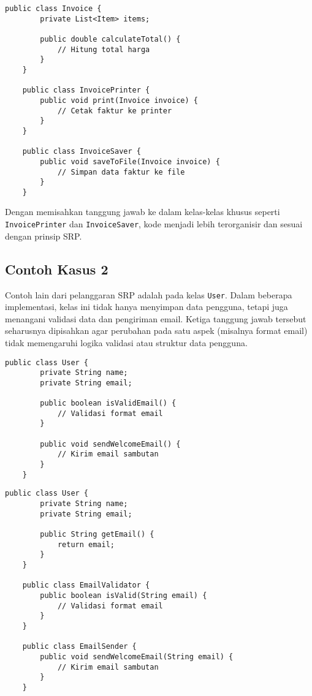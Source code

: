 \begin{lstlisting}[style=JavaStyle, caption={Refaktor menggunakan SRP}]
	public class Invoice {
		private List<Item> items;
		
		public double calculateTotal() {
			// Hitung total harga
		}
	}
	
	public class InvoicePrinter {
		public void print(Invoice invoice) {
			// Cetak faktur ke printer
		}
	}
	
	public class InvoiceSaver {
		public void saveToFile(Invoice invoice) {
			// Simpan data faktur ke file
		}
	}
\end{lstlisting}

Dengan memisahkan tanggung jawab ke dalam kelas-kelas khusus seperti \texttt{InvoicePrinter} dan \texttt{InvoiceSaver}, kode menjadi lebih terorganisir dan sesuai dengan prinsip SRP.

\subsection{Contoh Kasus 2}
Contoh lain dari pelanggaran SRP adalah pada kelas \texttt{User}. Dalam beberapa implementasi, kelas ini tidak hanya menyimpan data pengguna, tetapi juga menangani validasi data dan pengiriman email. Ketiga tanggung jawab tersebut seharusnya dipisahkan agar perubahan pada satu aspek (misalnya format email) tidak memengaruhi logika validasi atau struktur data pengguna.

\begin{lstlisting}[style=JavaStyle, caption={Contoh pelanggaran SRP}]
	public class User {
		private String name;
		private String email;
		
		public boolean isValidEmail() {
			// Validasi format email
		}
		
		public void sendWelcomeEmail() {
			// Kirim email sambutan
		}
	}
\end{lstlisting}

\begin{lstlisting}[style=JavaStyle, caption={Refaktor menggunakan SRP}]
	public class User {
		private String name;
		private String email;
		
		public String getEmail() {
			return email;
		}
	}
	
	public class EmailValidator {
		public boolean isValid(String email) {
			// Validasi format email
		}
	}
	
	public class EmailSender {
		public void sendWelcomeEmail(String email) {
			// Kirim email sambutan
		}
	}
\end{lstlisting}

